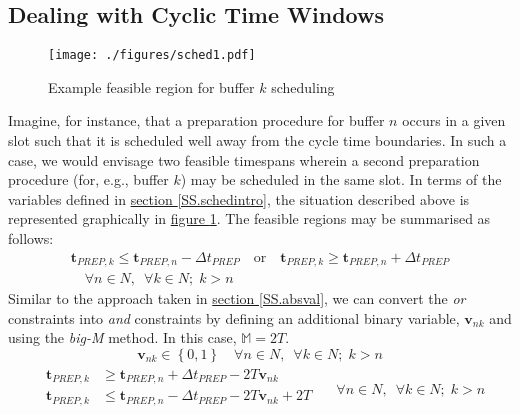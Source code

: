 \subsection{Dealing with Cyclic Time Windows}
\label{SS.cyclic}
\begin{figure}
    \centering
    \texttt{[image: ./figures/sched1.pdf]}
    \caption{Example feasible region for buffer $k$ scheduling}
    \label{fig.sched1}
\end{figure}
Imagine, for instance, that a preparation procedure for buffer $n$ occurs in a
given slot such that it is scheduled well away from the cycle time boundaries.
In such a case, we would envisage two feasible timespans wherein a second
preparation procedure (for, e.g., buffer $k$) may be scheduled in the same
slot.
In terms of the variables defined in 
\hyperref[SS.schedintro]{section \ref*{SS.schedintro}}, the situation described
above is represented graphically in 
\hyperref[fig.sched1]{figure \ref*{fig.sched1}}.
The feasible regions may be summarised as follows:
\begin{equation}
    \begin{split}
    \boldsymbol{t}_{\mathit{PREP},k} \le \boldsymbol{t}_{\mathit{PREP},n}
    - \Delta t_{\mathit{PREP}} \quad \text{or} \quad 
    \boldsymbol{t}_{\mathit{PREP},k} \ge \boldsymbol{t}_{\mathit{PREP},n} 
    + \Delta t_{\mathit{PREP}}\\
    \quad \forall n \in N, \enspace \forall k \in N; \; k > n
    \label{eq.k0}
    \end{split}    
\end{equation}
Similar to the approach taken in 
\hyperref[SS.absval]{section \ref*{SS.absval}}, we can convert the \emph{or}
constraints into \emph{and} constraints by defining an additional binary
variable, $\boldsymbol{v}_{nk}$ and using the \emph{big-M} method. In this
case, $\mathbb{M} = 2T$.
\begin{equation}
    \boldsymbol{v}_{nk} \in \left\{ 0, 1 \right\} \quad \forall n \in N,
    \enspace \forall k \in N; \; k > n
    \label{eq.v}
\end{equation}
\begin{equation}
    \begin{split}
        \begin{alignedat}{2}
            \boldsymbol{t}_{\mathit{PREP},k} &{}\ge{}
            \boldsymbol{t}_{\mathit{PREP},n} {}+{} \Delta t_{\mathit{PREP}}
            {}-{} 2T \boldsymbol{v}_{nk}\\
            \boldsymbol{t}_{\mathit{PREP},k} &{}\le{}
            \boldsymbol{t}_{\mathit{PREP},n} {}-{} \Delta t_{\mathit{PREP}}
            {}-{} 2T \boldsymbol{v}_{nk} {}+{} 2T\\
        \end{alignedat}
    \end{split}
    \quad \forall n \in N, \enspace \forall k \in N; \; k > n
    \label{eq.k1}
\end{equation}
